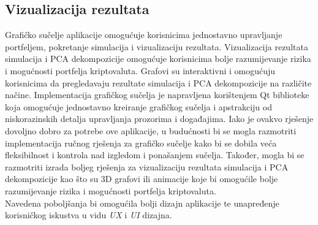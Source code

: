 \documentclass[zavrsnirad, upload]{fer}
\begin{document}
\subsection{Vizualizacija rezultata}
\label{sek:vizualizacija_rezultata_rezultati}
Grafičko sučelje aplikacije omogućuje korisnicima jednostavno
upravljanje portfeljem, pokretanje simulacija i vizualizaciju rezultata.
Vizualizacija rezultata simulacija i PCA dekompozicije
omogućuje korisnicima bolje razumijevanje rizika i mogućnosti portfelja
kriptovaluta. Grafovi su interaktivni i omogućuju korisnicima
da pregledavaju rezultate simulacija i PCA dekompozicije na različite načine.
Implementacija grafičkog sučelja je napravljena korištenjem Qt biblioteke
koja omogućuje jednostavno kreiranje grafičkog sučelja i apstrakciju
od niskorazinskih detalja upravljanja prozorima i događajima.
Iako je ovakvo rješenje dovoljno dobro za potrebe ove aplikacije,
u budućnosti bi se mogla razmotriti implementacija ručnog rješenja
za grafičko sučelje kako bi se dobila veća fleksibilnost i kontrola
nad izgledom i ponašanjem sučelja. Također, mogla bi se razmotriti
izrada boljeg rješenja za vizualizaciju rezultata simulacija i PCA dekompozicije
kao što su 3D grafovi ili animacije koje bi omogućile bolje razumijevanje
rizika i mogućnosti portfelja kriptovaluta.\\
Navedena poboljšanja bi omogućila bolji dizajn aplikacije
te unapređenje korisničkog iskustva u vidu \textit{UX} i \textit{UI} dizajna.
\end{document}
